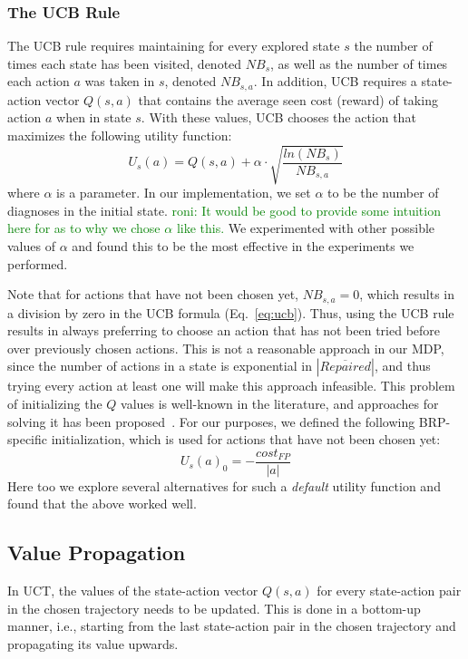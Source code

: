 \documentclass[review]{elsarticle}
\newcommand\roni[1]{\textcolor{green}{roni: #1}}
\newcommand{\notrepaired}{{\overline{\textit{Repaired}}}}
\begin{document}
\subsubsection{The UCB Rule}
The UCB rule requires maintaining for every explored state $s$ the number of times each state has been visited, denoted $NB_{s}$, as well as the number of times each action $a$ was taken in $s$, denoted $NB_{s,a}$. In addition, UCB requires a state-action vector $Q(s,a)$ that contains the average seen cost (reward) of taking action $a$ when in state $s$. With these values, UCB chooses the action that maximizes the following utility function:
\begin{equation}
U_s(a)= Q(s,a) + \alpha\cdot \sqrt{\frac{ln(NB_{s})}{NB_{s,a}}}
\label{eq:ucb}
\end{equation}
where $\alpha$ is a parameter. In our implementation, we set $\alpha$ to be the number of diagnoses in the initial state. \roni{It would be good to provide some intuition here for as to why we chose $\alpha$ like this.} We experimented with other possible values of $\alpha$ and found this to be the most effective in the experiments we performed.


Note that for actions that have not been chosen yet, $NB_{s,a} = 0$, which results in a division by zero in the UCB formula (Eq.~\ref{eq:ucb}). Thus, using the UCB rule results in always preferring to choose an action that has not been tried before over previously chosen actions. This is not a reasonable approach in our MDP, since the number of actions in a state is exponential in $|\notrepaired{}|$, and thus trying every action at least one will make this approach infeasible. This problem of initializing the $Q$ values is well-known in the literature, and approaches for solving it has been proposed~\cite{keller2012prost}. For our purposes, we defined the following BRP-specific initialization, which is used for actions that have not been chosen yet: 
\[ U_s(a)_0 = - \frac{cost_{FP}}{|a|} \]
Here too we explore several alternatives for 
such a \emph{default} utility function and found that the above worked well.

\subsection{Value Propagation}

In UCT, the values of the state-action vector $Q(s,a)$ for every state-action pair in the chosen trajectory needs to be updated. This is done in a bottom-up manner, i.e., starting from the last state-action pair in the chosen trajectory and propagating its value upwards. %
\end{document}

